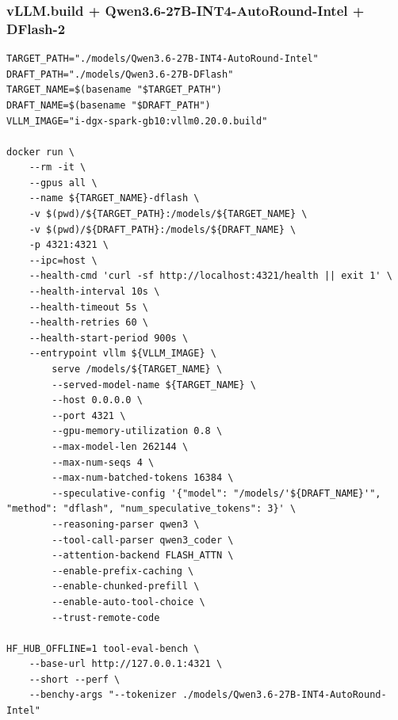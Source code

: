 \documentclass{article}
\begin{document}
\subsubsection{vLLM.build + Qwen3.6-27B-INT4-AutoRound-Intel + DFlash-2}
\begin{lstlisting}
TARGET_PATH="./models/Qwen3.6-27B-INT4-AutoRound-Intel"
DRAFT_PATH="./models/Qwen3.6-27B-DFlash"
TARGET_NAME=$(basename "$TARGET_PATH")
DRAFT_NAME=$(basename "$DRAFT_PATH")
VLLM_IMAGE="i-dgx-spark-gb10:vllm0.20.0.build"

docker run \
    --rm -it \
    --gpus all \
    --name ${TARGET_NAME}-dflash \
    -v $(pwd)/${TARGET_PATH}:/models/${TARGET_NAME} \
    -v $(pwd)/${DRAFT_PATH}:/models/${DRAFT_NAME} \
    -p 4321:4321 \
    --ipc=host \
    --health-cmd 'curl -sf http://localhost:4321/health || exit 1' \
    --health-interval 10s \
    --health-timeout 5s \
    --health-retries 60 \
    --health-start-period 900s \
    --entrypoint vllm ${VLLM_IMAGE} \
        serve /models/${TARGET_NAME} \
        --served-model-name ${TARGET_NAME} \
        --host 0.0.0.0 \
        --port 4321 \
        --gpu-memory-utilization 0.8 \
        --max-model-len 262144 \
        --max-num-seqs 4 \
        --max-num-batched-tokens 16384 \
        --speculative-config '{"model": "/models/'${DRAFT_NAME}'", "method": "dflash", "num_speculative_tokens": 3}' \
        --reasoning-parser qwen3 \
        --tool-call-parser qwen3_coder \
        --attention-backend FLASH_ATTN \
        --enable-prefix-caching \
        --enable-chunked-prefill \
        --enable-auto-tool-choice \
        --trust-remote-code

HF_HUB_OFFLINE=1 tool-eval-bench \
    --base-url http://127.0.0.1:4321 \
    --short --perf \
    --benchy-args "--tokenizer ./models/Qwen3.6-27B-INT4-AutoRound-Intel"
\end{lstlisting}
\end{document}
